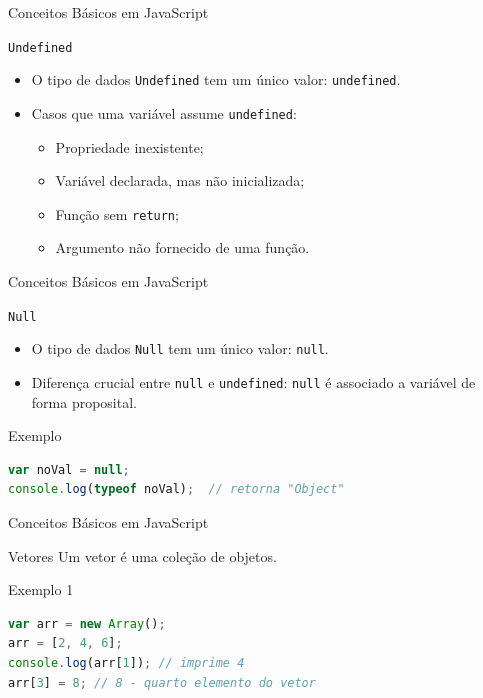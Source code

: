 \documentclass[xcolor=dvipsnames,table]{beamer}
\begin{document}
\begin{frame}[fragile]{Conceitos Básicos em JavaScript}
\begin{block}{\tt Undefined}
\begin{itemize}
\item O tipo de dados {\tt Undefined} tem um único valor: {\tt undefined}. \pause
\item Casos que uma variável assume {\tt undefined}: \pause
\begin{itemize}
\item Propriedade inexistente; \pause
\item Variável declarada, mas não inicializada; \pause
\item Função sem {\tt return}; \pause
\item Argumento não fornecido de uma função.
\end{itemize}
\end{itemize}
\end{block} 
\end{frame}

\begin{frame}[fragile]{Conceitos Básicos em JavaScript}
\begin{block}{\tt Null}
\begin{itemize}
\item O tipo de dados {\tt Null} tem um único valor: {\tt null}. \pause
\item Diferença crucial entre {\tt null} e {\tt undefined}: {\tt null} é associado a variável de forma proposital.
\end{itemize}	
\end{block} \pause
\begin{block}{Exemplo}
\begin{lstlisting}[language=JavaScript]
var noVal = null;
console.log(typeof noVal);	// retorna "Object"
\end{lstlisting}	
\end{block}
\end{frame}

\begin{frame}[fragile]{Conceitos Básicos em JavaScript}
\begin{block}{Vetores}
Um vetor é uma coleção de objetos.	
\end{block} \pause
\begin{block}{Exemplo 1}
\begin{lstlisting}[language=JavaScript]
var arr = new Array();
arr = [2, 4, 6];
console.log(arr[1]); // imprime 4
arr[3] = 8;	// 8 - quarto elemento do vetor
\end{lstlisting}	
\end{block}
\end{frame}
\end{document}
